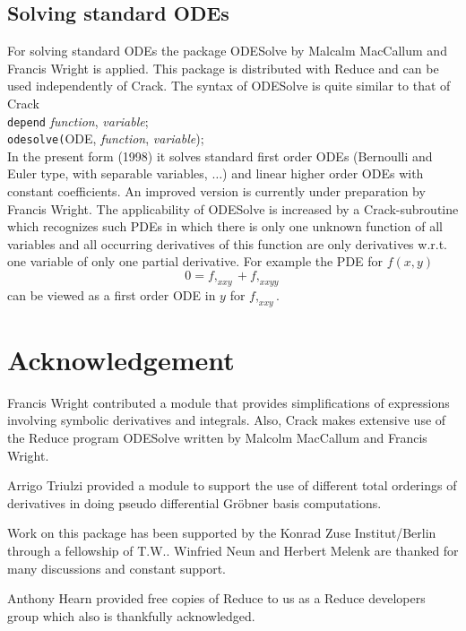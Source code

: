 \documentclass[12pt]{article}
\begin{document}
\subsection{Solving standard ODEs}
For solving standard ODEs the package {\sc ODESolve} by Malcalm MacCallum and
Francis Wright  
\cite{Mal} is applied. This package is distributed with {\sc Reduce} 
and can be used independently of {\sc Crack}. The syntax of
{\sc ODESolve} is quite similar to that of {\sc Crack} \\
\verb+depend+ {\it function}, {\it variable}; \\
\verb+odesolve(+ODE, {\it function}, {\it variable});  \\
In the present form (1998) it solves standard first order ODEs
(Bernoulli and Euler type, with separable variables, $\ldots$) and linear
higher order ODEs with constant coefficients. 
An improved version is currently under preparation by Francis Wright.
The applicability of {\sc ODESolve} is 
increased by a {\sc Crack}-subroutine which recognizes such PDEs in which
there is only one unknown function of all variables and all occurring
derivatives of this function
are only derivatives w.r.t. one variable of only one partial derivative.
For example the PDE for $f(x,y)$
\[ 0 = f,_{xxy} + f,_{xxyy} \]
can be viewed as a first order ODE in $y$ for $f,_{xxy}.$

\section{Acknowledgement}
Francis Wright contributed a module that provides simplifications
of expressions involving symbolic derivatives and integrals. Also, {\sc Crack}
makes extensive use of the {\sc Reduce} program {\sc ODESolve} written
by Malcolm MacCallum and Francis Wright.

Arrigo Triulzi provided a module to support the use of different total
orderings of derivatives in doing pseudo differential Gr\"{o}bner
basis computations.

Work on this package has been supported by the Konrad Zuse
Institut/Berlin through a fellowship of T.W..  Winfried
Neun and Herbert Melenk are thanked for many discussions and 
constant support.

Anthony Hearn provided free copies of {\sc Reduce} to us as a
{\sc Reduce} developers group which also is thankfully acknowledged.
\end{document}
